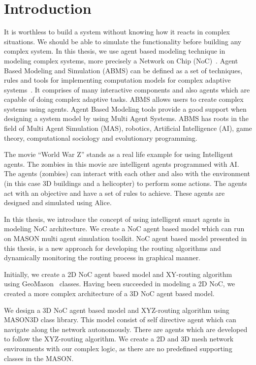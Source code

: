 \chapter {Introduction}

It is worthless to build a system without knowing how it reacts in complex situations. We should be able to simulate the functionality before building any complex system. In this thesis, we use agent based modeling technique in modeling complex systems, more precisely a Network on Chip (NoC)~\cite{Kumar}. Agent Based Modeling and Simulation (ABMS) can be defined as a set of techniques, rules and tools for implementing computation models for complex adaptive systems~\cite{macal2010}. It comprises of many interactive components and also agents which are capable of doing complex adaptive tasks. ABMS allows users to create complex systems using agents. Agent Based Modeling tools provide a good support when designing a system model by using Multi Agent Systems. ABMS has roots in the field of Multi Agent Simulation (MAS), robotics, Artificial Intelligence (AI), game theory, computational sociology and evolutionary programming. 
 
The movie ``World War Z'' stands as a real life example for using Intelligent agents. The zombies in this movie are intelligent agents programmed with AI. The agents (zombies) can interact with each other and also with the environment (in this case 3D buildings and a helicopter) to perform some actions. The agents act with an objective and have a set of rules to achieve. These agents are designed and simulated using Alice.
 
In this thesis, we introduce the concept of using intelligent smart agents in modeling NoC architecture. We create a NoC agent based model which can run on MASON multi agent simulation toolkit. NoC agent based model presented in this thesis, is a new approach for developing the routing algorithms and dynamically monitoring the routing process in graphical manner. 

Initially, we create a 2D NoC agent based model and XY-routing algorithm~\cite{XY} using GeoMason~\cite{Coletti} classes. Having been succeeded in modeling a 2D NoC, we created a more complex architecture of a 3D NoC agent based model. 

We design a 3D NoC agent based model and XYZ-routing algorithm using MASON3D class library. This model consist of self directive agent which can navigate along the network autonomously. There are agents which are developed to follow the XYZ-routing algorithm. We create a 2D and 3D mesh network environments with our complex logic, as there are no predefined supporting classes in the MASON.

